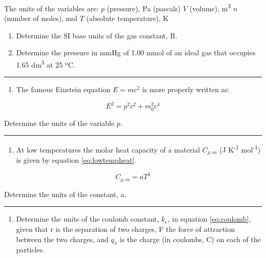 \documentclass[
]{book}
\providecommand{\tightlist}{%
  \setlength{\itemsep}{0pt}\setlength{\parskip}{0pt}}
\begin{document}
The units of the variables are:
\(p\) (pressure), Pa (pascals)
\(V\) (volume), m\textsuperscript{3}
\(n\) (number of moles), mol
\(T\) (absolute temperature), K

\begin{enumerate}
\def\labelenumi{\alph{enumi}.}
\item
  Determine the SI base units of the gas constant, R.
\item
  Determine the pressure in mmHg of 1.00 mmol of an ideal gas that occupies 1.65 dm\textsuperscript{3} at 25 ºC.
\end{enumerate}

\begin{center}\rule{0.5\linewidth}{0.5pt}\end{center}

\begin{enumerate}
\def\labelenumi{\arabic{enumi}.}
\setcounter{enumi}{1}
\tightlist
\item
  The famous Einstein equation \(E=mc^2\) is more properly written as:
\end{enumerate}

\begin{equation*}
E^2 = p^2 c^2 + m_0^2 c^4
\end{equation*}

Determine the units of the variable \(p\).

\begin{center}\rule{0.5\linewidth}{0.5pt}\end{center}

\begin{enumerate}
\def\labelenumi{\arabic{enumi}.}
\setcounter{enumi}{2}
\tightlist
\item
  At low temperatures the molar heat capacity of a material \(C_{p, m}\) (J K\textsuperscript{-1} mol\textsuperscript{-1}) is given by equation \eqref{eq:lowtempheat}.
\end{enumerate}

\begin{equation}
C_{p, m}= a T^3
\label{eq:lowtempheat}
\end{equation}

Determine the units of the constant, a.

\begin{center}\rule{0.5\linewidth}{0.5pt}\end{center}

\begin{enumerate}
\def\labelenumi{\arabic{enumi}.}
\setcounter{enumi}{3}
\tightlist
\item
  Determine the units of the coulomb constant, \(k_e\), in equation \eqref{eq:coulomb}, given that r is the separation of two charges, F the force of attraction between the two charges, and \(q_x\) is the charge (in coulombs, C) on each of the particles.
\end{enumerate}
\end{document}

